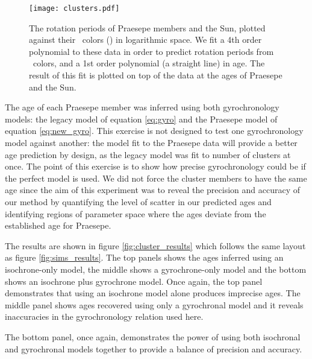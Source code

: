 \begin{figure}
  \caption{
    The rotation periods of Praesepe members and the Sun, plotted against
    their \Gaia\ colors (\gcolor) in logarithmic space.
    We fit a 4th order polynomial to these data in order to predict
    rotation periods from \gaia\ colors, and a 1st order polynomial (a
    straight line) in age.
The result of this fit is plotted on top of the data at the ages of
    Praesepe and the Sun.
}
  \centering
    \texttt{[image: clusters.pdf]}
\label{fig:clusters}
\end{figure}

The age of each Praesepe member was inferred using both gyrochronology models:
the legacy model of equation \ref{eq:gyro} and the Praesepe model of equation
\ref{eq:new_gyro}.
This exercise is not designed to test one gyrochronology model against
another: the model fit to the Praesepe data will provide a better age
prediction by design, as the legacy model was fit to number of clusters at
once.
The point of this exercise is to show how precise gyrochronology could be if
the perfect model is used.
We did not force the cluster members to have the same age since the aim of
this experiment was to reveal the precision and accuracy of our method by
quantifying the level of scatter in our predicted ages and identifying regions
of parameter space where the ages deviate from the established age for
Praesepe.

The results are shown in figure \ref{fig:cluster_results} which follows the
same layout as figure \ref{fig:sims_results}.
The top panels shows the ages inferred using an isochrone-only model, the
middle shows a gyrochrone-only model and the bottom shows an isochrone plus
gyrochrone model.
Once again, the top panel demonstrates that using an isochrone model alone
produces imprecise ages.
The middle panel shows ages recovered using only a gyrochronal model and it
reveals inaccuracies in the gyrochronology relation used here.

The bottom panel, once again, demonstrates the power of using both isochronal
and gyrochronal models together to provide a balance of precision and
accuracy.

